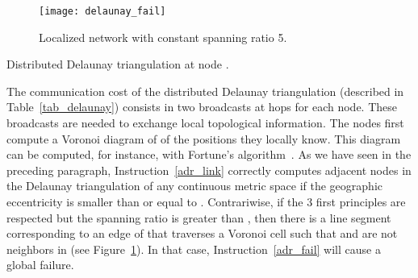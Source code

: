 \documentclass{article}
\begin{document}
\begin{figure}[htbp]
\begin{center}
\texttt{[image: delaunay\_fail]}
\caption{Localized network with constant spanning ratio 5.}
\label{fig_delaunay_fail}
\end{center}
\end{figure}

\begin{table}[htbp]
\begin{center}
\end{center}
\caption{Distributed Delaunay triangulation at node .}
\label{tab_delaunay}
\end{table}

The communication cost of the distributed Delaunay triangulation (described in Table~\ref{tab_delaunay}) consists in two broadcasts at  hops for each node. These broadcasts are needed to exchange local topological information. The nodes first compute a Voronoi diagram of  of the positions they locally know. This diagram can be computed, for instance, with Fortune's algorithm~\cite{bib_fortune}. As we have seen in the preceding paragraph, Instruction~\ref{adr_link} correctly computes adjacent nodes in the Delaunay triangulation of any continuous metric space  if the geographic eccentricity is smaller than or equal to . Contrariwise, if the 3 first principles are respected but the spanning ratio is greater than , then there is a line segment  corresponding to an edge of  that traverses a Voronoi cell  such that  and  are not neighbors in  (see Figure~\ref{fig_delaunay_fail}). In that case, Instruction~\ref{adr_fail} will cause a global failure.
\end{document}
